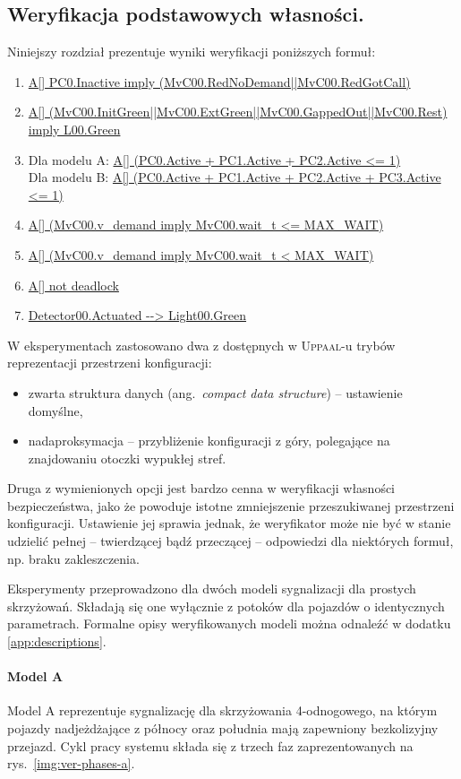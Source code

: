 \documentclass{pracamgr}
\newcommand{\ang}[1]{(ang.~\emph{#1})}
\newcommand{\imgr}[1]{rys.~\ref{#1}}
\newcommand{\upp}{\textsc{Uppaal}}
\newcommand{\ttt}[1]{\url{#1}}
\theoremstyle{plain}
\begin{document}
\subsection{Weryfikacja podstawowych własności.}
Niniejszy rozdział prezentuje wyniki weryfikacji poniższych formuł:
\begin{enumerate}
  \item \ttt{A[] PC0.Inactive imply (MvC00.RedNoDemand||MvC00.RedGotCall)}
  \item \ttt{A[]
  (MvC00.InitGreen||MvC00.ExtGreen||MvC00.GappedOut||MvC00.Rest) imply
  L00.Green}
  \item Dla modelu A: \ttt{A[] (PC0.Active + PC1.Active + PC2.Active
    <= 1)}\\
  Dla modelu B: \ttt{A[] (PC0.Active + PC1.Active + PC2.Active +
    PC3.Active <= 1)}
  \item \ttt{A[] (MvC00.v_demand imply MvC00.wait_t <= MAX_WAIT)}
  \item \ttt{A[] (MvC00.v_demand imply MvC00.wait_t < MAX_WAIT)}
  \item \ttt{A[] not deadlock}
  \item \ttt{Detector00.Actuated --> Light00.Green}
\end{enumerate}

W eksperymentach zastosowano dwa z dostępnych w \upp-u trybów
reprezentacji przestrzeni konfiguracji:
\begin{itemize}
  \item zwarta struktura danych \ang{compact data structure} -- ustawienie domyślne,
  \item nadaproksymacja -- przybliżenie konfiguracji z góry, polegające na
  znajdowaniu otoczki wypukłej stref.
\end{itemize}
Druga z wymienionych opcji jest bardzo cenna w weryfikacji własności
bezpieczeństwa, jako że powoduje istotne zmniejszenie przeszukiwanej
przestrzeni konfiguracji. Ustawienie jej sprawia jednak, że
weryfikator może nie być w stanie udzielić pełnej -- twierdzącej bądź
przeczącej -- odpowiedzi dla niektórych formuł, np. braku zakleszczenia.

Eksperymenty przeprowadzono dla dwóch modeli sygnalizacji dla prostych
skrzyżowań. Składają się one wyłącznie z potoków dla pojazdów o
identycznych parametrach. Formalne opisy weryfikowanych modeli można
odnaleźć w dodatku \ref{app:descriptions}.

\paragraph{Model A} Model A reprezentuje sygnalizację dla skrzyżowania
4-odnogowego, na którym pojazdy nadjeżdżające z północy oraz południa
mają zapewniony bezkolizyjny przejazd. Cykl pracy systemu składa się z
trzech faz zaprezentowanych na \imgr{img:ver-phases-a}.
\end{document}
